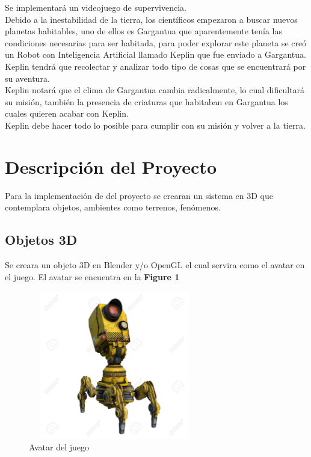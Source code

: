 \documentclass[a4paper]{article}
\begin{document}
Se implementará un videojuego de supervivencia.\\
Debido a la inestabilidad de la tierra, los científicos empezaron a buscar nuevos planetas habitables, uno de ellos es Gargantua que aparentemente tenía las condiciones necesarias para ser habitada, para poder explorar este planeta se creó un Robot con Inteligencia Artificial llamado Keplin que fue enviado a Gargantua. Keplin tendrá que recolectar y analizar todo tipo de cosas que se encuentrará por su aventura.\\
Keplin notará que el clima de Gargantua cambia radicalmente, lo cual dificultará su misión, también la presencia de criaturas que habitaban en Gargantua los cuales quieren acabar con Keplin.\\
Keplin debe hacer todo lo posible para cumplir con su misión y volver a la tierra.


\pagebreak

\section{Descripción del Proyecto}

Para la implementación de del proyecto se crearan un sistema en 3D que 
contemplara objetos, ambientes como terrenos, fenómenos.\\

\subsection{Objetos 3D}
Se creara un objeto 3D en Blender y/o OpenGL el cual servira como el avatar en el juego.
El avatar se encuentra en la \textbf{Figure 1}\\
\begin{figure}
	\centering
	\includegraphics[width=7.5cm,height=6.5cm]{Keplin.jpg}
	\caption{Avatar del juego}
	\label{FI1_1}
\end{figure}
\end{document}
